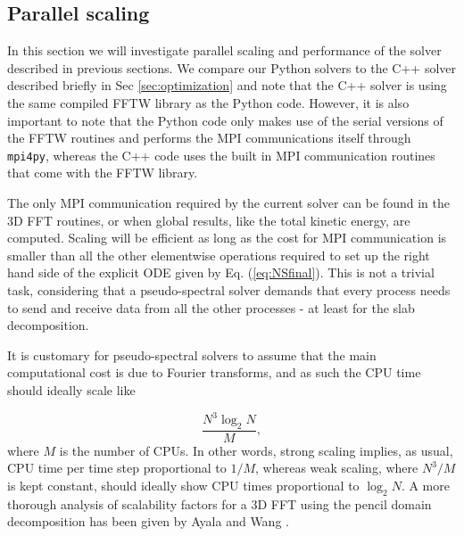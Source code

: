 \documentclass[final,1p,times]{elsarticle}
\newcommand{\inpyth}{\lstinline[style=inlinestyle]} %[]%
\begin{document}
\subsection{Parallel scaling}
In this section we will investigate parallel scaling and performance of the solver described in previous sections. We compare our Python solvers to the C++ solver described briefly in Sec \ref{sec:optimization} and note that the C++ solver is using the same compiled FFTW library as the Python code. However, it is also important to note that the Python code only makes use of the serial versions of the FFTW routines and performs the MPI communications itself through
\inpyth{mpi4py}, whereas the C++ code uses the built in MPI communication routines that come with the FFTW library.

The only MPI communication required by the current solver can be found in the 3D
FFT routines, or when global results, like the total kinetic energy, are
computed. Scaling will be efficient as long as the cost for MPI
communication is smaller than all the other elementwise operations required
to set up the right hand side of the explicit ODE given by Eq.
(\ref{eq:NSfinal}). This is not a trivial task, considering that a pseudo-spectral solver demands that every process needs to send and receive data
from all the other processes - at least for the slab decomposition.

It is customary for pseudo-spectral solvers to assume that the main computational cost is due to Fourier transforms, and as such the CPU time should ideally scale like

\begin{equation}
 \frac{N^3 \log_2 N}{M},
\end{equation}
where $M$ is the number of CPUs. In other words, strong scaling implies, as usual, CPU time per time step proportional to $1/M$, whereas weak scaling, where $N^3/M$ is kept constant, should ideally show CPU times proportional to $\log_2 N$. A more thorough analysis of scalability factors for a 3D FFT using the pencil domain decomposition has been given by Ayala and Wang \cite{ayala2013}.
\end{document}
